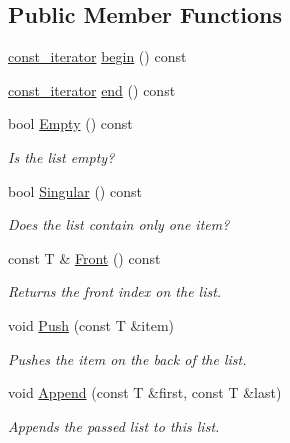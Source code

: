 \subsection*{Public Member Functions}
\begin{DoxyCompactItemize}
\item 
\hyperlink{struct_simulator_1_1_linked_list_1_1const__iterator}{const\+\_\+iterator} \hyperlink{class_simulator_1_1_linked_list_a04e58fe78575a003af98e260074dc1c2}{begin} () const 
\item 
\hyperlink{struct_simulator_1_1_linked_list_1_1const__iterator}{const\+\_\+iterator} \hyperlink{class_simulator_1_1_linked_list_a1db0ff2837096157dd2f4760f56403f1}{end} () const 
\item 
bool \hyperlink{class_simulator_1_1_linked_list_af99b6273ee92fea4893b3ec1489da1b4}{Empty} () const 
\begin{DoxyCompactList}\small\item\em Is the list empty? \end{DoxyCompactList}\item 
bool \hyperlink{class_simulator_1_1_linked_list_a028131ae012a077c7f4254798fa618d8}{Singular} () const 
\begin{DoxyCompactList}\small\item\em Does the list contain only one item? \end{DoxyCompactList}\item 
const T \& \hyperlink{class_simulator_1_1_linked_list_a72352135ae1f5d455a14bb9c61f7d8a4}{Front} () const 
\begin{DoxyCompactList}\small\item\em Returns the front index on the list. \end{DoxyCompactList}\item 
void \hyperlink{class_simulator_1_1_linked_list_a2bb01160e996b0610c47c12a7ff3ee38}{Push} (const T \&item)
\begin{DoxyCompactList}\small\item\em Pushes the item on the back of the list. \end{DoxyCompactList}\item 
void \hyperlink{class_simulator_1_1_linked_list_afa817691100ea5c8289cf8454c7cf3d2}{Append} (const T \&first, const T \&last)
\begin{DoxyCompactList}\small\item\em Appends the passed list to this list. \end{DoxyCompactList}\item 

\end{DoxyCompactItemize}
